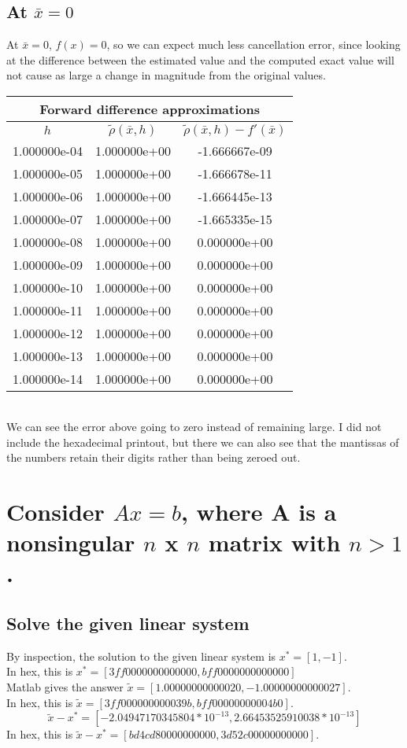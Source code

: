 \documentclass[11pt]{modart}
\begin{document}
\subsection{At $\bar{x}=0$}
At $\bar{x}=0$, $f(x)=0$, so we can expect much less cancellation error, since looking at the difference between
the estimated value and the computed exact value will not cause as large a change in magnitude from the original values.

\begin{tabular}{|c|c|c|}
  \hline
  \multicolumn{3}{|c|}{Forward difference approximations}\\
  \hline
  $h$ & $\tilde{\rho} (\bar{x}, h)$ & $\tilde{\rho} (\bar{x}, h)- f'(\bar{x})$ \\
  \hline
1.000000e-04 & 1.000000e+00 & -1.666667e-09\\
\hline
 1.000000e-05 & 1.000000e+00 & -1.666678e-11\\
\hline
 1.000000e-06 & 1.000000e+00 & -1.666445e-13\\
\hline
 1.000000e-07 & 1.000000e+00 & -1.665335e-15\\
\hline
 1.000000e-08 & 1.000000e+00 & 0.000000e+00\\
\hline
 1.000000e-09 & 1.000000e+00 & 0.000000e+00\\
\hline
 1.000000e-10 & 1.000000e+00 & 0.000000e+00\\
\hline
 1.000000e-11 & 1.000000e+00 & 0.000000e+00\\
\hline
 1.000000e-12 & 1.000000e+00 & 0.000000e+00\\
\hline
 1.000000e-13 & 1.000000e+00 & 0.000000e+00\\
\hline
 1.000000e-14 & 1.000000e+00 & 0.000000e+00\\
\hline
\end{tabular}\\

We can see the error above going to zero instead of remaining large.  I did not include the hexadecimal printout,
but there we can also see that the mantissas of the numbers retain their digits rather than being zeroed out.

\section{Consider $Ax=b$, where A is a nonsingular $n$ x $n$ matrix with $n>1$.}
\subsection{Solve the given linear system}
By inspection, the solution to the given linear system is $x^*=[1, -1]$.\\
In hex, this is $x^*=[3ff0000000000000, bff0000000000000]$\\
Matlab gives the answer $\tilde{x}=[1.00000000000020, -1.00000000000027]$.\\
In hex, this is $\tilde{x} = [3ff000000000039b, bff00000000004b0]$.\\
$$\tilde{x}-x^*= [-2.04947170345804 * 10^{-13}, 2.66453525910038 * 10^{-13}]$$
In hex, this is $\tilde{x}-x^* = [bd4cd80000000000, 3d52c00000000000]$.\\
\end{document}
